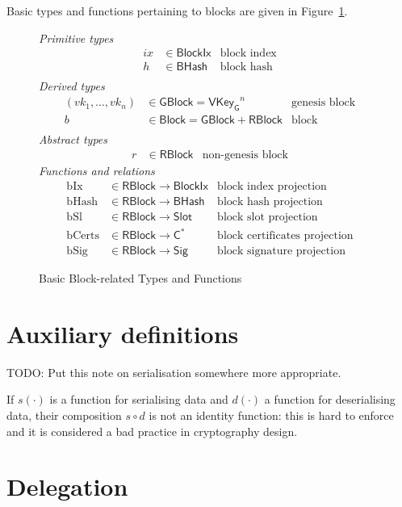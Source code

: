 \documentclass[11pt,a4paper]{article}
\newcommand{\type}[1]{\mathsf{#1}}
\newcommand{\seqof}[1]{#1^{*}}
\newcommand{\BHash}{\type{BHash}}  %
\newcommand{\Slot}{\type{Slot}}
\newcommand{\BlockIx}{\type{BlockIx}}
\newcommand{\GBlock}{\type{GBlock}}
\newcommand{\RBlock}{\type{RBlock}}
\newcommand{\Block}{\type{Block}}
\newcommand{\HCert}{\type{C}}
\newcommand{\VKeyGen}{\type{VKey_G}}
\newcommand{\Sig}{\type{Sig}}
\newcommand{\hashname}{bHash}
\newcommand{\totalf}{\to}
\begin{document}
Basic types and functions pertaining to blocks are given in
Figure~\ref{fig:block-defs}.

\begin{figure}
  \emph{Primitive types}
  \begin{align*}
    ix & \in \BlockIx & \text{block index}\\
     h & \in \BHash   & \text{block hash}\\
  \end{align*}
  \emph{Derived types}
  \begin{align*}
    (vk_1, \dotsc, vk_n) & \in \GBlock = \VKeyGen^n & \text{genesis block} \\
    b & \in \Block = \GBlock + \RBlock & \text{block} \\
  \end{align*}
  \emph{Abstract types}
  \begin{align*}
    r & \in \RBlock & \text{non-genesis block}
  \end{align*}
  \emph{Functions and relations}
  \begin{align*}
    \text{bIx} & \in \RBlock \totalf \BlockIx & \text{block index projection} \\
    \text{\hashname} & \in \RBlock \totalf \BHash
      & \text{block hash projection} \\
    \text{bSl} & \in \RBlock \totalf \Slot & \text{block slot projection} \\
    \text{bCerts} & \in \RBlock \totalf \seqof{\HCert}
      & \text{block certificates projection} \\
    \text{bSig} & \in \RBlock \totalf \Sig & \text{block signature projection}
  \end{align*}
  \caption{Basic Block-related Types and Functions}
  \label{fig:block-defs}
\end{figure}


\section{Auxiliary definitions}
\label{sec:auxil-defin}
TODO: Put this note on serialisation somewhere more appropriate.

If $s(\cdot)$ is a function for serialising data and $d(\cdot)$ a function for
deserialising data, their composition $s \circ d$ is not an identity function:
%
this is hard to enforce and it is considered a bad practice in cryptography
design.

\section{Delegation}
\label{sec:delegation}
\end{document}
